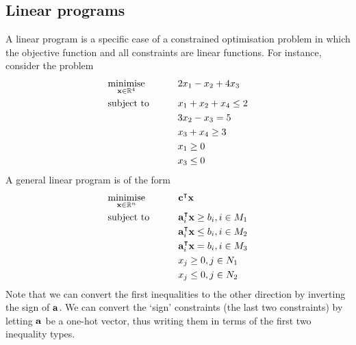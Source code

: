 \subsection{Linear programs}
A linear program is a specific case of a constrained optimisation problem in which the objective function and all constraints are linear functions.
For instance, consider the problem
\begin{alignat*}{2}
	 & \underset{\vb x \in \mathbb R^4}{\text{minimise}} & \qquad & 2x_1 - x_2 + 4x_3      \\
	 & \text{subject to}                                 &        & x_1 + x_2 + x_4 \leq 2 \\
	 &                                                   &        & 3x_2 - x_3 = 5         \\
	 &                                                   &        & x_3 + x_4 \geq 3       \\
	 &                                                   &        & x_1 \geq 0             \\
	 &                                                   &        & x_3 \leq 0             \\
\end{alignat*}
A general linear program is of the form
\begin{alignat*}{2}
	 & \underset{\vb x \in \mathbb R^n}{\text{minimise}} & \qquad & \vb c^\intercal \vb x                       \\
	 & \text{subject to}                                 &        & \vb a_i^\intercal \vb x \geq b_i, i \in M_1 \\
	 &                                                   &        & \vb a_i^\intercal \vb x \leq b_i, i \in M_2 \\
	 &                                                   &        & \vb a_i^\intercal \vb x = b_i, i \in M_3    \\
	 &                                                   &        & x_j \geq 0, j \in N_1                        \\
	 &                                                   &        & x_j \leq 0, j \in N_2                        \\
\end{alignat*}
Note that we can convert the first inequalities to the other direction by inverting the sign of \( \vb a \).
We can convert the `sign' constraints (the last two constraints) by letting \( \vb a \) be a one-hot vector, thus writing them in terms of the first two inequality types.

